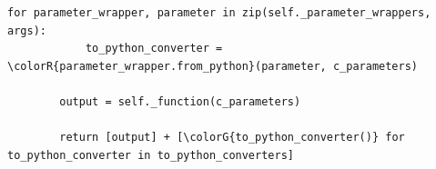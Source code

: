 \begin{frame}[fragile]
{\begin{center}
\begin{minipage}{.8\linewidth}
\begin{Verbatim}[commandchars=\\\{\}]
        for parameter_wrapper, parameter in zip(self._parameter_wrappers, args):
            to_python_converter = \colorR{parameter_wrapper.from_python}(parameter, c_parameters)

        output = self._function(c_parameters)

        return [output] + [\colorG{to_python_converter()} for to_python_converter in to_python_converters]
\end{Verbatim}
    \end{minipage}
  \end{center}}
  \note{
    \begin{enumerate}
    \item 
    \end{enumerate}
  }
\end{frame}

